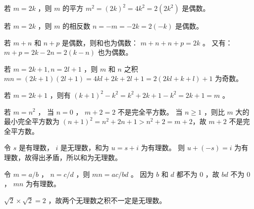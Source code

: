 {{        %
        \begin{practices}
            若 $m = 2k$ ，则 $m$ 的平方 $m^2 = (2k)^2 = 4k^2 = 2(2k^2)$ 是偶数。
        \end{practices}

        \begin{practices}
            若 $m = 2k$ ，则 $m$ 的相反数 $n = -m = -2k = 2(-k)$ 是偶数。
        \end{practices}

        \begin{practices}
            若 $m + n$ 和 $n + p$ 是偶数，则和也为偶数： $m + n + n + p = 2k$ 。
            又有： $m + p = 2k - 2n = 2(k -n)$ 也为偶数。
        \end{practices}

        \begin{practices}
            若 $m = 2k + 1, n = 2l + 1$ ，则 $m$ 和 $n$ 之积 $mn = (2k + 1)(2l + 1) = 4kl + 2k + 2l + 1 = 2(2kl + k +l) + 1$ 为奇数。
        \end{practices}

        \begin{practices}
            若 $m = 2k+ 1$ ，则有 $(k + 1)^2 - k^2 = k^2 + 2k + 1 - k^2 = 2k + 1 = m$ 。
        \end{practices}

        \begin{practices}
            若 $m = n^2$ ，
            当 $n = 0$ ， $m + 2 = 2$ 不是完全平方数。
            当 $n \geq 1$ ，则比 $m$ 大的最小完全平方数为 $(n + 1)^2 = n^2 + 2n + 1 > n^2 + 2 = m + 2$，故 $m + 2$ 不是完全平方数。
        \end{practices}

        \begin{practices}
            令 $s$ 是有理数， $i$ 是无理数，和为 $u = s + i$ 为有理数。
            则 $u + (-s) = i$ 为有理数，故得出矛盾，所以和为无理数。
        \end{practices}

        \begin{practices}
            令 $m = a / b$ ， $n = c / d$ ，则 $mn = ac / bd$ 。
            因为 $b$ 和 $d$ 都不为 $0$ ，故 $bd$ 不为 $0$ ， $mn$ 为有理数。
        \end{practices}

        \begin{practices}
            $\sqrt{2} \times \sqrt{2} = 2$ ，故两个无理数之积不一定是无理数。
        \end{practices}

}}

